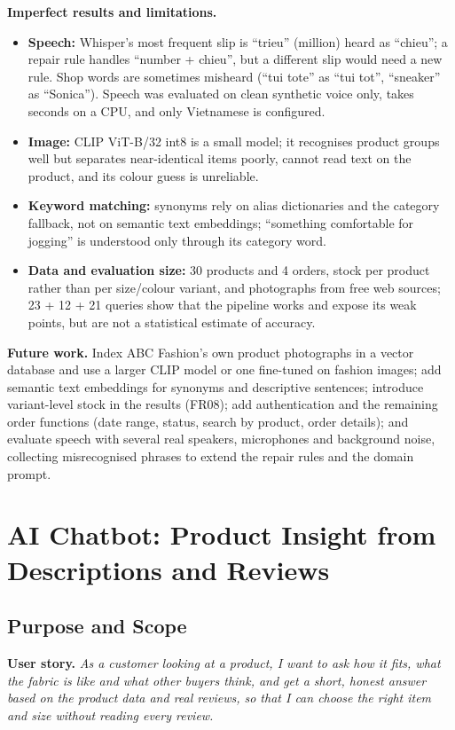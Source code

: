 \textbf{Imperfect results and limitations.}
\begin{itemize}
  \item \textbf{Speech:} Whisper's most frequent slip is ``trieu'' (million) heard as ``chieu''; a repair rule handles ``number + chieu'', but a different slip would need a new rule. Shop words are sometimes misheard (``tui tote'' as ``tui tot'', ``sneaker'' as ``Sonica''). Speech was evaluated on clean synthetic voice only, takes seconds on a CPU, and only Vietnamese is configured.
  \item \textbf{Image:} CLIP ViT-B/32 int8 is a small model; it recognises product groups well but separates near-identical items poorly, cannot read text on the product, and its colour guess is unreliable.
  \item \textbf{Keyword matching:} synonyms rely on alias dictionaries and the category fallback, not on semantic text embeddings; ``something comfortable for jogging'' is understood only through its category word.
  \item \textbf{Data and evaluation size:} 30 products and 4 orders, stock per product rather than per size/colour variant, and photographs from free web sources; 23 + 12 + 21 queries show that the pipeline works and expose its weak points, but are not a statistical estimate of accuracy.
\end{itemize}

\textbf{Future work.} Index ABC Fashion's own product photographs in a vector database and use a larger CLIP model or one fine-tuned on fashion images; add semantic text embeddings for synonyms and descriptive sentences; introduce variant-level stock in the results (FR08); add authentication and the remaining order functions (date range, status, search by product, order details); and evaluate speech with several real speakers, microphones and background noise, collecting misrecognised phrases to extend the repair rules and the domain prompt.

\section{AI Chatbot: Product Insight from Descriptions and Reviews}
\label{sec:chatbot}

\subsection{Purpose and Scope}
\label{sec:feature}
\textbf{User story.} \emph{As a customer looking at a product, I want to ask how it fits, what the fabric is like and what other buyers think, and get a short, honest answer based on the product data and real reviews, so that I can choose the right item and size without reading every review.}


